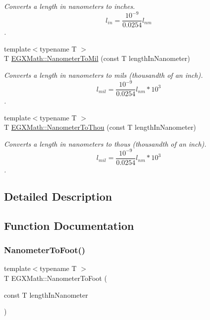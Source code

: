 \begin{DoxyCompactItemize}
\begin{DoxyCompactList}\small\item\em Converts a length in nanometers to inches. \[ l_{in}= \frac{10^{-9}}{0.0254} l_{nm} \]. \end{DoxyCompactList}\item 
{\footnotesize template$<$typename T $>$ }\\T \mbox{\hyperlink{group___e_g_x_math-_conversions-_length_conversions-_nanometer-_imperial_gacfd62a86ae9a5085569840f3b7bbdb3e}{E\+G\+X\+Math\+::\+Nanometer\+To\+Mil}} (const T length\+In\+Nanometer)
\begin{DoxyCompactList}\small\item\em Converts a length in nanometers to mils (thousandth of an inch). \[ l_{mil}= \frac{10^{-9}}{0.0254} l_{nm} * 10^{3} \]. \end{DoxyCompactList}\item 
{\footnotesize template$<$typename T $>$ }\\T \mbox{\hyperlink{group___e_g_x_math-_conversions-_length_conversions-_nanometer-_imperial_ga4c714a8d3ab333da358dafe181ebdcc4}{E\+G\+X\+Math\+::\+Nanometer\+To\+Thou}} (const T length\+In\+Nanometer)
\begin{DoxyCompactList}\small\item\em Converts a length in nanometers to thous (thousandth of an inch). \[ l_{mil}= \frac{10^{-9}}{0.0254} l_{nm} * 10^{3} \]. \end{DoxyCompactList}\end{DoxyCompactItemize}


\subsection{Detailed Description}


\subsection{Function Documentation}
\mbox{\label{group___e_g_x_math-_conversions-_length_conversions-_nanometer-_imperial_ga7c6124e07aa11d37695c96c5a520197d}} 
\subsubsection{\texorpdfstring{Nanometer\+To\+Foot()}{NanometerToFoot()}}
{\footnotesize\ttfamily template$<$typename T $>$ \\
T E\+G\+X\+Math\+::\+Nanometer\+To\+Foot (\begin{DoxyParamCaption}\item[{const T}]{length\+In\+Nanometer }\end{DoxyParamCaption})}



